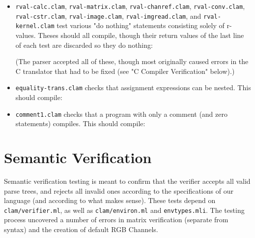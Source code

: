 \begin{itemize}
\item \texttt{rval-calc.clam}, \texttt{rval-matrix.clam}, \texttt{rval-chanref.clam}, \texttt{rval-conv.clam},
\texttt{rval-cstr.clam}, \texttt{rval-image.clam}, \texttt{rval-imgread.clam}, and \texttt{rval-kernel.clam}
test various "do nothing" statements consisting solely of r-values. Theses should all compile, though their
return values of the last line of each test are discarded so they do nothing:








(The parser accepted all of these, though most originally caused errors in the C translator
that had to be fixed (see "C Compiler Verification" below).)

\item \texttt{equality-trans.clam} checks that assignment expressions can be nested. This should compile:


\item \texttt{comment1.clam} checks that a program with only a comment (and zero statements) compiles. This should compile:


\end{itemize}

\section{Semantic Verification}
\label{testing:semantic}

Semantic verification testing is meant to confirm that the verifier accepts all valid parse trees,
and rejects all invalid ones according to the specifications of our language
(and according to what makes sense).
These tests depend on \texttt{clam/verifier.ml}, as well as \texttt{clam/environ.ml} and \texttt{envtypes.mli}. 
The testing process uncovered a number of errors in matrix verification (separate from syntax)
and the creation of default RGB Channels.\\

